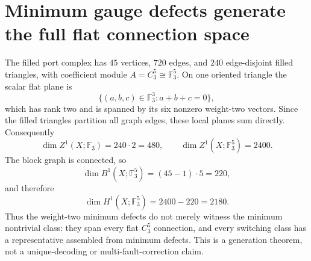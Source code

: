 \section{Minimum gauge defects generate the full flat connection space}
\label{sec:minimum-gauge-defect-generation}
The filled port complex has $45$ vertices, $720$ edges, and $240$ edge-disjoint filled triangles, with coefficient module $A=C_3^5\cong\mathbb F_3^5$.  On one oriented triangle the scalar flat plane is
\[
  \{(a,b,c)\in\mathbb F_3^3:a+b+c=0\},
\]
which has rank two and is spanned by its six nonzero weight-two vectors.  Since the filled triangles partition all graph edges, these local planes sum directly.  Consequently
\[
  \dim Z^1(X;\mathbb F_3)=240\cdot2=480,
  \qquad
  \boxed{\dim Z^1(X;\mathbb F_3^5)=2400}.
\]
The block graph is connected, so
\[
  \dim B^1(X;\mathbb F_3^5)=(45-1)\cdot5=220,
\]
and therefore
\[
  \boxed{\dim H^1(X;\mathbb F_3^5)=2400-220=2180}.
\]
Thus the weight-two minimum defects do not merely witness the minimum nontrivial class: they span every flat $C_3^5$ connection, and every switching class has a representative assembled from minimum defects.  This is a generation theorem, not a unique-decoding or multi-fault-correction claim.
